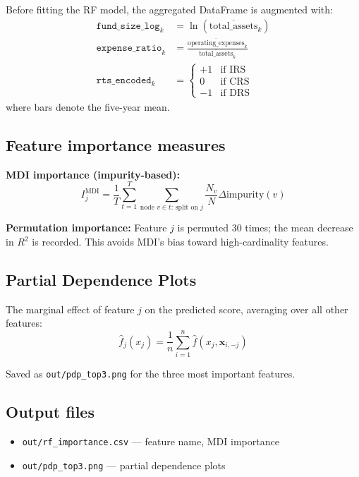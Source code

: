\documentclass[12pt,a4paper]{article}
\begin{document}
Before fitting the RF model, the aggregated DataFrame is augmented with:
\begin{align*}
    \texttt{fund\_size\_log}_k &= \ln(\overline{\text{total\_assets}}_{k}) \\
    \texttt{expense\_ratio}_k &= \frac{\overline{\text{operating\_expenses}}_{k}}
                                      {\overline{\text{total\_assets}}_{k}} \\
    \texttt{rts\_encoded}_k &=
        \begin{cases} +1 & \text{if IRS} \\ 0 & \text{if CRS} \\ -1 & \text{if DRS} \end{cases}
\end{align*}
where bars denote the five-year mean.

\subsection{Feature importance measures}

\textbf{MDI importance (impurity-based):}
\[
    I_j^{\text{MDI}} = \frac{1}{T} \sum_{t=1}^{T} \sum_{\text{node } v \in t:\, \text{split on } j}
    \frac{N_v}{N} \Delta \text{impurity}(v)
\]

\textbf{Permutation importance:}  Feature $j$ is permuted 30 times; the mean
decrease in $R^2$ is recorded.  This avoids MDI's bias toward high-cardinality
features.

\subsection{Partial Dependence Plots}

The marginal effect of feature $j$ on the predicted score, averaging over all
other features:
\[
    \hat{f}_j(x_j) = \frac{1}{n} \sum_{i=1}^{n} \hat{f}(x_j, \mathbf{x}_{i, -j})
\]

Saved as \texttt{out/pdp\_top3.png} for the three most important features.

\subsection{Output files}

\begin{itemize}
    \item \texttt{out/rf\_importance.csv} --- feature name, MDI importance
    \item \texttt{out/pdp\_top3.png}     --- partial dependence plots
\end{itemize}
\end{document}
